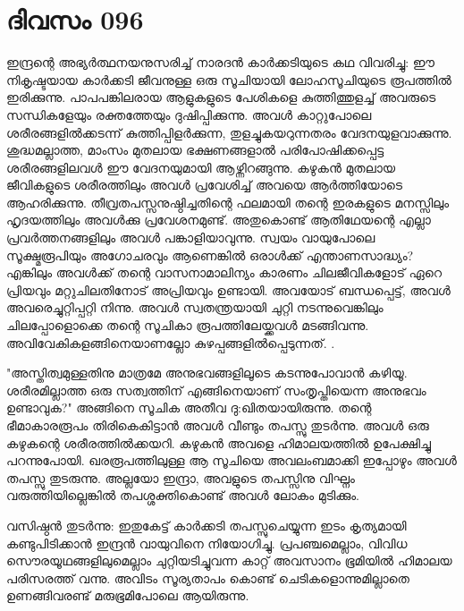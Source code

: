 \newpage
\section{ദിവസം 096}


ഇന്ദ്രന്റെ അഭ്യര്‍ത്ഥനയനുസരിച്ച്‌ നാരദന്‍ കാര്‍ക്കടിയുടെ കഥ വിവരിച്ചു: ഈ നികൃഷ്ടയായ കാര്‍ക്കടി ജീവനുള്ള ഒരു സൂചിയായി ലോഹസൂചിയുടെ രൂപത്തില്‍ ഇരിക്കുന്നു. പാപപങ്കിലരായ ആളുകളുടെ പേശികളെ കുത്തിത്തുളച്ച്‌ അവരുടെ സന്ധികളേയും രക്തത്തേയും ദുഷിപ്പിക്കുന്നു. അവള്‍ കാറ്റുപോലെ ശരീരങ്ങളില്‍ക്കടന്ന് കുത്തിപ്പിളര്‍ക്കുന്ന, തുളച്ചുകയറുന്നതരം വേദനയുളവാക്കുന്നു. ശുദ്ധമല്ലാത്ത, മാംസം മുതലായ ഭക്ഷണങ്ങളാല്‍ പരിപോഷിക്കപ്പെട്ട ശരീരങ്ങളിലവള്‍ ഈ വേദനയുമായി ആഴ്ന്നിറങ്ങുന്നു. കഴുകന്‍ മുതലായ ജീവികളുടെ ശരീരത്തിലും അവള്‍ പ്രവേശിച്ച്‌ അവയെ ആര്‍ത്തിയോടെ ആഹരിക്കുന്നു. തീവ്രതപസ്സനുഷ്ഠിച്ചതിന്റെ ഫലമായി തന്റെ ഇരകളുടെ മനസ്സിലും ഹൃദയത്തിലും അവള്‍ക്കു പ്രവേശനമുണ്ട്‌. അതുകൊണ്ട്‌ ആതിഥേയന്റെ എല്ലാ പ്രവര്‍ത്തനങ്ങളിലും അവള്‍ പങ്കാളിയാവുന്നു. സ്വയം വായുപോലെ സൂക്ഷ്മരൂപിയും അഗോചരവും ആണെങ്കില്‍ ഒരാള്‍ക്ക്‌ എന്താണസാദ്ധ്യം? എങ്കിലും അവള്‍ക്ക്‌ തന്റെ വാസനാമാലിന്യം കാരണം ചിലജീവികളോട്‌ ഏറെ പ്രിയവും മറ്റുചിലതിനോട്‌ അപ്രിയവും ഉണ്ടായി. അവയോട്‌ ബന്ധപ്പെട്ട്‌, അവള്‍ അവരെച്ചുറ്റിപ്പറ്റി നിന്നു. അവള്‍ സ്വതന്ത്രയായി ചുറ്റി നടന്നുവെങ്കിലും ചിലപ്പോളൊക്കെ തന്റെ സൂചികാ രൂപത്തിലേയ്ക്കവള്‍ മടങ്ങിവന്നു. അവിവേകികളങ്ങിനെയാണല്ലോ കുഴപ്പങ്ങളില്‍പ്പെടുന്നത്‌. .

"അസ്തിത്വമുള്ളതിനു മാത്രമേ അനുഭവങ്ങളിലൂടെ കടന്നുപോവാന്‍ കഴിയൂ. ശരീരമില്ലാത്ത ഒരു സത്വത്തിന്‌ എങ്ങിനെയാണ്‌ സംതൃപ്തിയെന്ന അനുഭവം ഉണ്ടാവുക?" അങ്ങിനെ സൂചിക അതീവ ദു:ഖിതയായിരുന്നു. തന്റെ ഭീമാകാരരൂപം തിരികെകിട്ടാന്‍ അവള്‍ വീണ്ടും തപസ്സു തുടര്‍ന്നു. അവള്‍ ഒരു കഴുകന്റെ ശരീരത്തില്‍ക്കയറി. കഴുകന്‍ അവളെ ഹിമാലയത്തില്‍ ഉപേക്ഷിച്ചു പറന്നുപോയി. ഖരരൂപത്തിലുള്ള ആ സൂചിയെ അവലംബമാക്കി ഇപ്പോഴും അവള്‍  തപസ്സു തുടരുന്നു. അല്ലയോ ഇന്ദ്രാ, അവളുടെ തപസ്സിനു വിഘ്നം വരുത്തിയില്ലെങ്കില്‍ തപശ്ശക്തികൊണ്ട്‌ അവള്‍ ലോകം മുടിക്കും. 

വസിഷ്ഠന്‍ തുടര്‍ന്നു: ഇതുകേട്ട്‌ കാര്‍ക്കടി തപസ്സുചെയ്യുന്ന ഇടം കൃത്യമായി കണ്ടുപിടിക്കാന്‍ ഇന്ദ്രന്‍ വായുവിനെ നിയോഗിച്ചു. പ്രപഞ്ചമെല്ലാം, വിവിധ സൌരയൂഥങ്ങളിലുമെല്ലാം ചുറ്റിയടിച്ചുവന്ന കാറ്റ്‌ അവസാനം ഭൂമിയില്‍ ഹിമാലയ പരിസരത്ത്‌ വന്നു. അവിടം സൂര്യതാപം കൊണ്ട്‌ ചെടികളൊന്നുമില്ലാതെ ഉണങ്ങിവരണ്ട്‌ മരുഭൂമിപോലെ ആയിരുന്നു.

